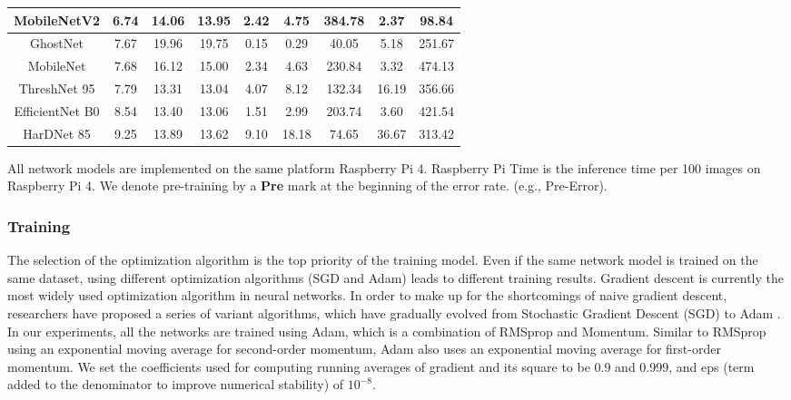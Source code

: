 \documentclass[default,iicol]{sn-jnl}
\theoremstyle{thmstyleone}\newtheorem{theorem}{Theorem}\newtheorem{proposition}[theorem]{Proposition}
\theoremstyle{thmstyletwo}\newtheorem{example}{Example}\newtheorem{remark}{Remark}
\theoremstyle{thmstylethree}\newtheorem{definition}{Definition}
\begin{document}
\begin{table*}[]
{\begin{tabular}{|c|c|c|c|c|c|c|c|c|}
MobileNetV2 \cite{sandler2018mobilenetv2} & 6.74 & 14.06 & 13.95 & 2.42 & 4.75 & 384.78 & 2.37 & 98.84 \\ \hline
GhostNet \cite{han2020ghostnet} & 7.67 & 19.96 & 19.75 & 0.15 & 0.29 & 40.05 & 5.18 & 251.67 \\ \hline
MobileNet \cite{howard2017mobilenets} & 7.68 & 16.12 & 15.00 & 2.34 & 4.63 & 230.84 & 3.32 & 474.13 \\ \hline
ThreshNet 95 \cite{ju2022threshnet} & 7.79 & 13.31 & 13.04 & 4.07 & 8.12 & 132.34 & 16.19 & 356.66 \\ \hline
EfficientNet B0 \cite{tan2019efficientnet} & 8.54 & 13.40 & 13.06 & 1.51 & 2.99 & 203.74 & 3.60 & 421.54 \\ \hline
HarDNet 85 \cite{chao2019hardnet} & 9.25 & 13.89 & 13.62 & 9.10 & 18.18 & 74.65 & 36.67 & 313.42 \\ \hline
\end{tabular}
}
\vspace{1mm}
\begin{tablenotes}
All network models are implemented on the same platform Raspberry Pi 4. Raspberry Pi Time is the inference time per 100 images on Raspberry Pi 4. We denote pre-training by a \textbf{Pre} mark at the beginning of the error rate. (e.g., Pre-Error).
\end{tablenotes}
\end{table*}

\subsubsection{Training}
The selection of the optimization algorithm is the top priority of the training model. Even if the same network model is trained on the same dataset, using different optimization algorithms (SGD and Adam) leads to different training results. Gradient descent is currently the most widely used optimization algorithm in neural networks. In order to make up for the shortcomings of naive gradient descent, researchers have proposed a series of variant algorithms, which have gradually evolved from Stochastic Gradient Descent (SGD) to Adam \cite{kingma2014adam}. In our experiments, all the networks are trained using Adam, which is a combination of RMSprop and Momentum. Similar to RMSprop using an exponential moving average for second-order momentum, Adam also uses an exponential moving average for first-order momentum. We set the coefficients used for computing running averages of gradient and its square to be 0.9 and 0.999, and eps (term added to the denominator to improve numerical stability) of ${10}^{-8}$. 
\end{document}
